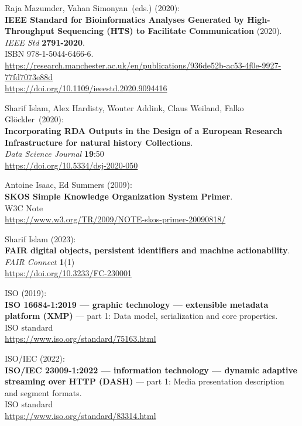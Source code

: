 \begin{thebibliography}{9}
Raja Mazumder, Vahan Simonyan~(eds.) (2020):\\
\textbf{IEEE Standard for Bioinformatics Analyses Generated by
High-Throughput Sequencing (HTS) to Facilitate Communication} (2020).\\
\emph{IEEE Std} \textbf{2791-2020}.\\
ISBN 978-1-5044-6466-6.\\
\url{https://research.manchester.ac.uk/en/publications/936de52b-ac53-4f0e-9927-77fd7073e88d}\\
\url{https://doi.org/10.1109/ieeestd.2020.9094416}

Sharif Islam, Alex Hardisty, Wouter Addink, Claus Weiland, Falko Glöckler~(2020):\\
\textbf{Incorporating RDA Outputs in the Design of a European Research Infrastructure for natural history Collections}.\\
\emph{Data Science Journal} \textbf{19}:50\\
\url{https://doi.org/10.5334/dsj-2020-050}

Antoine Isaac, Ed Summers (2009): \\
\textbf{SKOS Simple Knowledge Organization System Primer}. \\
W3C Note \\
\url{https://www.w3.org/TR/2009/NOTE-skos-primer-20090818/}

Sharif Islam (2023): \\
\textbf{FAIR digital objects, persistent identifiers and machine actionability}. \\
\emph{FAIR Connect} \textbf{1}(1) \\
\url{https://doi.org/10.3233/FC-230001}

ISO (2019): \\
\textbf{{ISO} 16684-1:2019 --- graphic technology --- extensible metadata platform (XMP)} --- part 1: Data model, serialization and core properties.\\
ISO standard\\
\url{https://www.iso.org/standard/75163.html}

ISO/IEC (2022): \\
\textbf{{ISO}/{IEC} 23009-1:2022 --- information technology ---
dynamic adaptive streaming over HTTP (DASH)} --- part 1: Media
presentation description and segment formats.\\
ISO standard\\
\url{https://www.iso.org/standard/83314.html}



\end{thebibliography}
